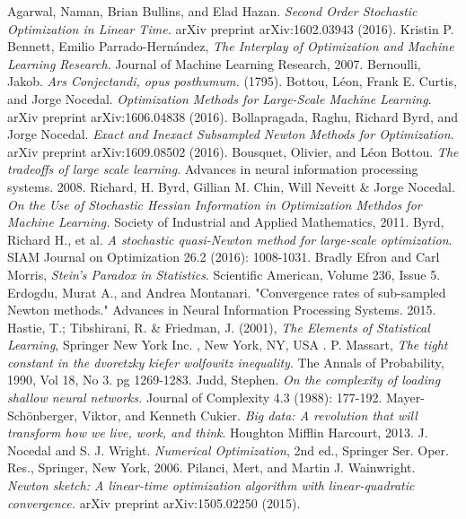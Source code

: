 \documentclass{book}
\theoremstyle{plain}
\theoremstyle{definition}
\theoremstyle{remark}
\begin{document}
\begin{thebibliography}{9}
Agarwal, Naman, Brian Bullins, and Elad Hazan. \emph{Second Order Stochastic Optimization in Linear Time.} arXiv preprint arXiv:1602.03943 (2016).
 Kristin P. Bennett, Emilio Parrado-Hernández, \emph{The Interplay of Optimization and Machine Learning Research}. Journal of Machine Learning Research, 2007.
Bernoulli, Jakob. \emph{Ars Conjectandi, opus posthumum.} (1795).
  Bottou, Léon, Frank E. Curtis, and Jorge Nocedal. \emph{Optimization Methods for Large-Scale Machine Learning}. arXiv preprint arXiv:1606.04838 (2016).
Bollapragada, Raghu, Richard Byrd, and Jorge Nocedal. \emph{Exact and Inexact Subsampled Newton Methods for Optimization.} arXiv preprint arXiv:1609.08502 (2016).
Bousquet, Olivier, and Léon Bottou. \emph{The tradeoffs of large scale learning}. Advances in neural information processing systems. 2008.
 Richard, H. Byrd, Gillian M. Chin, Will Neveitt \& Jorge Nocedal.
  \emph{On the Use of Stochastic Hessian Information in Optimization Methdos for Machine Learning.} Society of Industrial and Applied Mathematics, 2011.
 Byrd, Richard H., et al. \emph{A stochastic quasi-Newton method for large-scale optimization}. SIAM Journal on Optimization 26.2 (2016): 1008-1031.
 Bradly Efron and Carl Morris, \emph{Stein's Paradox in Statistics}. Scientific American, Volume 236, Issue 5.
Erdogdu, Murat A., and Andrea Montanari. "Convergence rates of sub-sampled Newton methods." Advances in Neural Information Processing Systems. 2015.
 Hastie, T.; Tibshirani, R. \& Friedman, J. (2001), \emph{The Elements of Statistical Learning}, Springer New York Inc. , New York, NY, USA .
 P. Massart, \emph{The tight constant in the dvoretzky kiefer wolfowitz inequality}. The Annals of Probability, 1990, Vol 18, No 3. pg 1269-1283.
Judd, Stephen. \emph{On the complexity of loading shallow neural networks.} Journal of Complexity 4.3 (1988): 177-192.
 Mayer-Schönberger, Viktor, and Kenneth Cukier. \emph{Big data: A revolution that will transform how we live, work, and think}. Houghton Mifflin Harcourt, 2013.
 J. Nocedal and S. J. Wright. \emph{Numerical Optimization}, 2nd ed., Springer Ser. Oper. Res., Springer, New York, 2006.
Pilanci, Mert, and Martin J. Wainwright. \emph{Newton sketch: A linear-time optimization algorithm with linear-quadratic convergence.} arXiv preprint arXiv:1505.02250 (2015).

\end{thebibliography}
\end{document}
